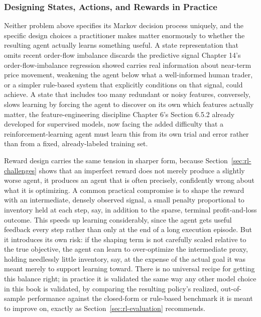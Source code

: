 \documentclass[../ai_in_finance]{subfiles}
\begin{document}
\subsubsection*{Designing States, Actions, and Rewards in Practice}

Neither problem above specifies its Markov decision process uniquely, and the specific design choices a practitioner makes matter enormously to whether the resulting agent actually learns something useful. A state representation that omits recent order-flow imbalance discards the predictive signal Chapter 14's order-flow-imbalance regression showed carries real information about near-term price movement, weakening the agent below what a well-informed human trader, or a simpler rule-based system that explicitly conditions on that signal, could achieve. A state that includes too many redundant or noisy features, conversely, slows learning by forcing the agent to discover on its own which features actually matter, the feature-engineering discipline Chapter 6's Section 6.5.2 already developed for supervised models, now facing the added difficulty that a reinforcement-learning agent must learn this from its own trial and error rather than from a fixed, already-labeled training set.

Reward design carries the same tension in sharper form, because Section~\ref{sec:rl-challenges} shows that an imperfect reward does not merely produce a slightly worse agent, it produces an agent that is often precisely, confidently wrong about what it is optimizing. A common practical compromise is to shape the reward with an intermediate, densely observed signal, a small penalty proportional to inventory held at each step, say, in addition to the sparse, terminal profit-and-loss outcome. This speeds up learning considerably, since the agent gets useful feedback every step rather than only at the end of a long execution episode. But it introduces its own risk: if the shaping term is not carefully scaled relative to the true objective, the agent can learn to over-optimize the intermediate proxy, holding needlessly little inventory, say, at the expense of the actual goal it was meant merely to support learning toward. There is no universal recipe for getting this balance right; in practice it is validated the same way any other model choice in this book is validated, by comparing the resulting policy's realized, out-of-sample performance against the closed-form or rule-based benchmark it is meant to improve on, exactly as Section~\ref{sec:rl-evaluation} recommends.
\end{document}

